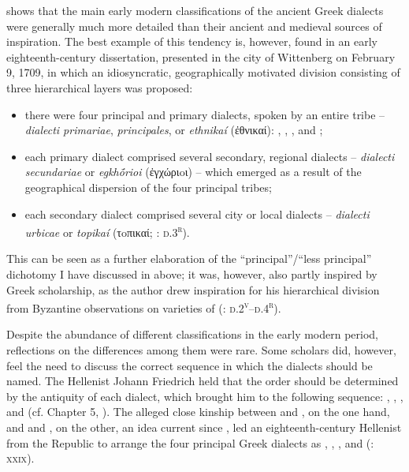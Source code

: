  shows that the main early modern classifications of the ancient Greek dialects were generally much more detailed than their ancient and medieval sources of inspiration. The best example of this tendency is, however, found in an early eighteenth-century dissertation, presented in the city of Wittenberg on February 9, 1709, in which an idiosyncratic, geographically motivated division consisting of three hierarchical layers was proposed:

\begin{itemize}
\item there were four principal and primary dialects, spoken by an entire tribe – \textit{dialecti primariae}, \textit{principales}, or \textit{ethnikaí} (ἐθνικαί): , , , and ;

\item each primary dialect comprised several secondary, regional dialects – \textit{dialecti secundariae} or \textit{egkhṓrioi} (ἐγχώριoι) – which emerged as a result of the geographical dispersion of the four principal tribes;

\item each secondary dialect comprised several city or local dialects – \textit{dialecti urbicae} or \textit{topikaí} (τoπικαί; \citealt{Thryllitsch1709}: \textsc{d.3}\textsc{\textsuperscript{r}}).

\end{itemize}

This can be seen as a further elaboration of the “principal”/“less principal” dichotomy I have discussed in  above; it was, however, also partly inspired by Greek scholarship, as the author drew inspiration for his hierarchical division from Byzantine observations on varieties of  (\citealt{Thryllitsch1709}: \textsc{d.2}\textsc{\textsuperscript{v}}\textsc{–d.4}\textsc{\textsuperscript{r}}).

Despite the abundance of different classifications in the early modern period, reflections on the differences among them were rare. Some scholars did, however, feel the need to discuss the correct sequence in which the dialects should be named. The  Hellenist Johann Friedrich \citet[\textsc{iv}]{Facius1782} held that the order should be determined by the antiquity of each dialect, which brought him to the following sequence: , , , and  (cf. Chapter 5, ). The alleged close kinship between  and , on the one hand, and  and , on the other, an idea current since , led an eighteenth-century Hellenist from the  Republic to arrange the four principal Greek dialects as , , , and  (\citealt{Koen1766}: \textsc{xxix}).

